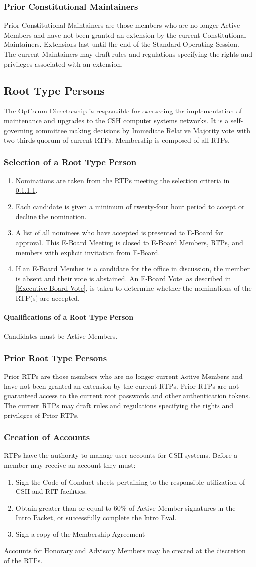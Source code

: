 \documentclass{article}
\newcommand{\asection}[1]{\subsection{#1} \label{#1}}
\newcommand{\asubsection}[1]{\subsubsection{#1} \label{#1}}
\newcommand{\asubsubsection}[1]{\paragraph{#1} \label{#1}}
\begin{document}
\asubsection{Prior Constitutional Maintainers}
Prior Constitutional Maintainers are those members who are no longer Active Members and have not been granted an extension by the current Constitutional Maintainers.
Extensions last until the end of the Standard Operating Session. 
The current Maintainers may draft rules and regulations specifying the rights and privileges associated with an extension.

\asection{Root Type Persons}
The OpComm Directorship is responsible for overseeing the implementation of maintenance and upgrades to the CSH computer systems networks.
It is a self-governing committee making decisions by Immediate Relative Majority vote with two-thirds quorum of current RTPs.
Membership is composed of all RTPs.

\asubsection{Selection of a Root Type Person}
\renewcommand{\theenumi}{\alph{enumi}} %
\begin{enumerate}
	\item Nominations are taken from the RTPs meeting the selection criteria in \ref{Qualifications of a Root Type Person}.
	\item Each candidate is given a minimum of twenty-four hour period to accept or decline the nomination.
	\item A list of all nominees who have accepted is presented to E-Board for approval.
	      This E-Board Meeting is closed to E-Board Members, RTPs, and members with explicit invitation from E-Board.
	\item If an E-Board Member is a candidate for the office in discussion, the member is absent and their vote is abstained.
	      An E-Board Vote, as described in \ref{Executive Board Vote}, is taken to determine whether the nominations of the RTP(s) are accepted.
\end{enumerate}

\asubsubsection{Qualifications of a Root Type Person}
Candidates must be Active Members.

\asubsection{Prior Root Type Persons}
Prior RTPs are those members who are no longer current Active Members and have not been granted an extension by the current RTPs.
Prior RTPs are not guaranteed access to the current root passwords and other authentication tokens.
The current RTPs may draft rules and regulations specifying the rights and privileges of Prior RTPs.

\asubsection{Creation of Accounts}
RTPs have the authority to manage user accounts for CSH systems.
Before a member may receive an account they must:
\renewcommand{\theenumi}{\arabic{enumi}} %
\begin{enumerate}
	\item Sign the Code of Conduct sheets pertaining to the responsible utilization of CSH and RIT facilities.
	\item Obtain greater than or equal to 60\% of Active Member signatures in the Intro Packet, or successfully complete the Intro Eval.
	\item Sign a copy of the Membership Agreement
\end{enumerate}
Accounts for Honorary and Advisory Members may be created at the discretion of the RTPs.
\end{document}
